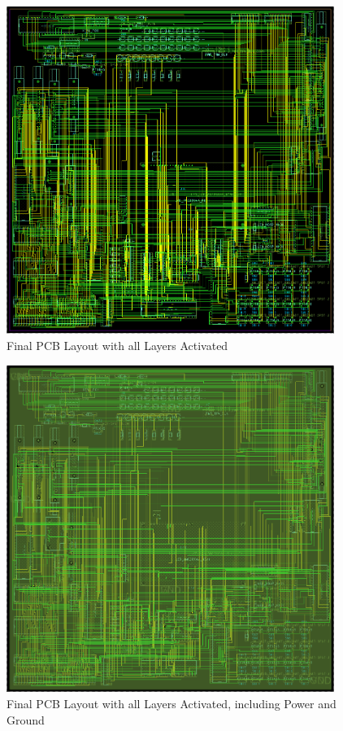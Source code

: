         \begin{figure}[ht]
            \begin{center}
                \includegraphics[width=0.95\textwidth]{figures/board.png}
                \caption{Final PCB Layout with all Layers Activated} \label{fig:board}
            \end{center}
        \end{figure}

        \begin{figure}[ht]
            \begin{center}
                \includegraphics[width=0.95\textwidth]{figures/all.png}
                \caption{Final PCB Layout with all Layers Activated, including Power and Ground} \label{fig:all}
            \end{center}
        \end{figure}

